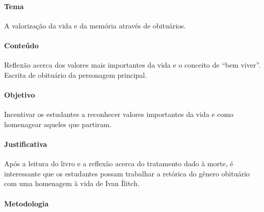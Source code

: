 \documentclass[12pt]{extarticle}
\begin{document}



\paragraph{Tema} A valorização da vida e da memória através de obituários.

\paragraph{Conteúdo} Reflexão acerca dos valores 
mais importantes da vida e o conceito de ``bem viver''.
Escrita de obituário da personagem principal.

\paragraph{Objetivo} Incentivar os estudantes a reconhecer
valores importantes da vida e como homenagear aqueles que partiram.

\paragraph{Justificativa} Após a leitura do livro e a reflexão acerca do tratamento dado à morte,
é interessante que os estudantes possam trabalhar a retórica do gênero obituário com uma homenagem à vida de Ivan Ílitch.

\paragraph{Metodologia} 
\end{document}

